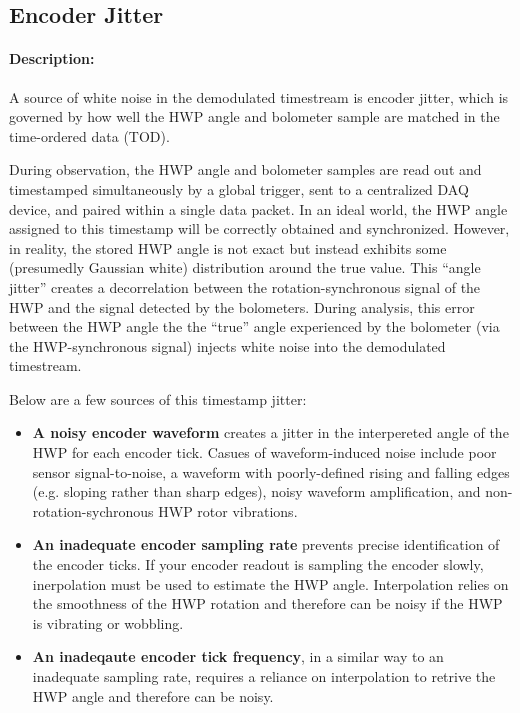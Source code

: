 \subsection{Encoder Jitter}

\paragraph{Description:} 

A source of white noise in the demodulated timestream is encoder jitter, which is governed by how well the HWP angle and bolometer sample are matched in the time-ordered data (TOD). 

During observation, the HWP angle and bolometer samples are read out and timestamped simultaneously by a global trigger, sent to a centralized DAQ device, and paired within a single data packet. In an ideal world, the HWP angle assigned to this timestamp will be correctly obtained and synchronized. However, in reality, the stored HWP angle is not exact but instead exhibits some (presumedly Gaussian white) distribution around the true value. This ``angle jitter'' creates a decorrelation between the rotation-synchronous signal of the HWP and the signal detected by the bolometers. During analysis, this error between the HWP angle the the ``true'' angle experienced by the bolometer (via the HWP-synchronous signal) injects white noise into the demodulated timestream.

Below are a few sources of this timestamp jitter:

\begin{itemize}
 \item \textbf{A noisy encoder waveform} creates a jitter in the interpereted angle of the HWP for each encoder tick. Casues of waveform-induced noise include poor sensor signal-to-noise, a waveform with poorly-defined rising and falling edges (e.g. sloping rather than sharp edges), noisy waveform amplification, and non-rotation-sychronous HWP rotor vibrations.
 \item \textbf{An inadequate encoder sampling rate} prevents precise identification of the encoder ticks. If your encoder readout is sampling the encoder slowly, inerpolation must be used to estimate the HWP angle. Interpolation relies on the smoothness of the HWP rotation and therefore can be noisy if the HWP is vibrating or wobbling.
 \item \textbf{An inadeqaute encoder tick frequency}, in a similar way to an inadequate sampling rate, requires a reliance on interpolation to retrive the HWP angle and therefore can be noisy.
 \end{itemize}
  

